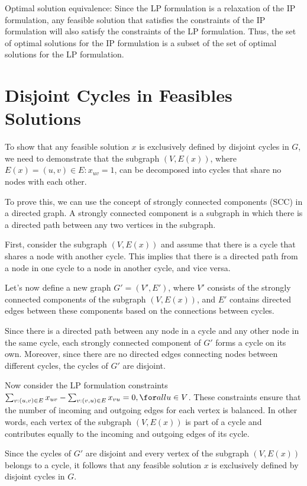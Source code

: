 \documentclass{ULBreport}
\begin{document}
Optimal solution equivalence:
Since the LP formulation is a relaxation of the IP formulation, any feasible solution that satisfies the constraints of the IP formulation will also satisfy the constraints of the LP formulation. Thus, the set of optimal solutions for the IP formulation is a subset of the set of optimal solutions for the LP formulation.
\newpage
\section{Disjoint Cycles in Feasibles Solutions}

To show that any feasible solution $x$ is exclusively defined by disjoint cycles in $G$, we need to demonstrate that the subgraph $(V, E(x))$, where $E(x) = {(u, v) \in E : x_{uv} = 1}$, can be decomposed into cycles that share no nodes with each other.

To prove this, we can use the concept of strongly connected components (SCC) in a directed graph. A strongly connected component is a subgraph in which there is a directed path between any two vertices in the subgraph.

First, consider the subgraph $(V, E(x))$ and assume that there is a cycle that shares a node with another cycle. This implies that there is a directed path from a node in one cycle to a node in another cycle, and vice versa.

Let's now define a new graph $G'=(V',E')$, where $V'$ consists of the strongly connected components of the subgraph $(V, E(x))$, and $E'$ contains directed edges between these components based on the connections between cycles.

Since there is a directed path between any node in a cycle and any other node in the same cycle, each strongly connected component of $G'$ forms a cycle on its own. Moreover, since there are no directed edges connecting nodes between different cycles, the cycles of $G'$ are disjoint.

Now consider the LP formulation constraints $\sum_{v :(u, v) \in E} x_{uv} - \sum_{v :(v, u) \in E} x_{vu} = 0, \for all u \in V$. These constraints ensure that the number of incoming and outgoing edges for each vertex is balanced. In other words, each vertex of the subgraph $(V, E(x))$ is part of a cycle and contributes equally to the incoming and outgoing edges of its cycle.

Since the cycles of $G'$ are disjoint and every vertex of the subgraph $(V, E(x))$ belongs to a cycle, it follows that any feasible solution $x$ is exclusively defined by disjoint cycles in $G$.
\end{document}
